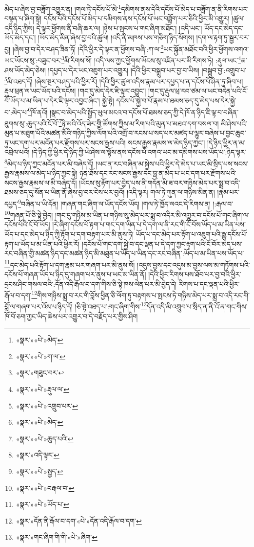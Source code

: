 མེད་པ་ཞེས་བྱ་བཟློག་འགྱུར་ན། །གལ་ཏེ་དངོས་པོ་མེ་\footnote{«སྣར་»«པེ་»མེད་}དམིགས་ནས་དེའི་དངོས་པོ་མེད་པ་བཟློག་ན་ནི་རིགས་པར་བསྟན་པ་ཞིག་སྟེ། དངོས་པོའི་དངོས་པོ་མེད་པ་དམིགས་ནས་དངོས་པོ་ཡང་བཟློག་པར་ཅིའི་ཕྱིར་མི་འགྱུར། །ཚུལ་འདི་ཉིད་ཀྱིས། དེ་ལྟར་ཕྱོགས་ནི་བཞི་ཆར་ལ། །ཉེས་པ་སྤངས་པ་གང་ཞིག་མཐོང་། །འདི་ཡང་། ཡོད་དང་མེད་དང་ཡོད་མེད་དང་། །ཡོད་མེད་མིན་ཞེས་བྱ་བའི་ཚུལ། །འདི་ནི་མཁས་པས་གཅིག་ཉིད་སོགས། །དག་ལ་རྟག་ཏུ་སྦྱར་བར་བྱ། །ཞེས་བྱ་བ་དེར་བཤད་ཟིན་ཏོ། །དེའི་ཕྱིར་དེ་ལྟར་ན་ཕྱོགས་བཞི་:ཀ་ལ་\footnote{«སྣར་»«པེ་»ག་ལ་}ཡང་སྐྱོན་མཐོང་བའི་ཕྱིར་ཕྱོགས་འགའ་ཡང་ཡོངས་སུ་:བཟུང་བར་\footnote{«སྣར་»གཟུང་བར་}མི་རིགས་སོ། །འདི་ལས་ཀྱང་ཕྱོགས་ཡོངས་སུ་འཛིན་པར་མི་རིགས་ཏེ། :རྡུལ་ཡང་\footnote{«སྣར་»«པེ་»རྡུལ་ལ་}ཆ་ཤས་ཡོད་མེད་ཅེས། །དཔྱད་པ་དེར་ཡང་འཇུག་པར་འགྱུར། །དེའི་ཕྱིར་བསྒྲུབ་པར་བྱ་བ་ཡིས། །བསྒྲུབ་བྱ་:འགྲུབ་པ་\footnote{«སྣར་»«པེ་»འགྲུབ་པར་}མི་འཐད་དོ། །ཞེས་སྔར་བཤད་པའི་ཕྱིར་རོ། །དེའི་ཕྱིར་ཚུལ་འདིས་རྣམ་པར་དཔྱད་པ་ན་དངོས་པོ་ཤིན་ཏུ་ཞིབ་པ། རྡུལ་ཕྲན་ལ་ཡང་ཡོད་པའི་དངོས། །གང་དུ་མེད་དེར་ཇི་ལྟར་འབྱུང་། །གང་དུ་རྡུལ་ཕྲ་རབ་ཙམ་ལ་ཡང་བདེན་པའི་ངོ་བོ་ཡོད་པ་མ་ཡིན་པ་དེར་ཇི་ལྟར་འབྱང་ཞིང་། སྐྱེ་སྟེ། དངོས་པོ་སྐྱེ་བ་པོ་རྣམ་པ་ཐམས་ཅད་དུ་མེད་པས་དེར་སྐྱེ་བ་:མེད་པ་\footnote{«སྣར་»«པེ་»མེད་}ཁོ་ནའོ། །སྣང་བ་མེད་པའི་སྤྱོད་ཡུལ་མངའ་བ་དངོས་པོ་ཐམས་ཅད་ཀྱི་དེ་ཁོ་ན་ཉིད་ཇི་ལྟ་བ་བཞིན་ཐུགས་སུ་:ཆུད་པའི་ངོ་བོ་\footnote{«སྣར་»«པེ་»ཆུད་པའི་}ཉི་མའི་འོད་ཟེར་གྱི་ཚོགས་ཀྱིས་མ་རིག་པའི་མུན་པ་མཐའ་དག་བསལ་བ། མི་ཤེས་པའི་མུན་པ་མཐུག་པོའི་མཚན་མོའི་གཉིད་ཀྱིས་ལོག་པའི་འགྲོ་བ་རངས་པ་སད་པར་མཛད་པ་ལྷུར་བཞེས་པ་བྱང་ཆུབ་ཏུ་ཡང་དག་པར་མངོན་པར་རྫོགས་པར་སངས་རྒྱས་པའི། སངས་རྒྱས་རྣམས་ལ་མེད་ཉིད་ཀྱང་། །དེ་ཉིད་ཕྱིར་ན་མ་འབྲེལ་པའོ། །དེ་ཉིད་ཀྱི་ཕྱིར་དེ་ཉིད་ཀྱི་ཡེ་ཤེས་ལ་ལྟོས་ནས་དངོས་པོ་འགའ་ཡང་མ་དམིགས་པས་ཡོད་པ་:ཉིད་ལྟར་\footnote{«སྣར་»འདི་ལྟར་}མེད་པ་ཉིད་ཀྱང་མངོན་པར་མི་བཞེད་དོ། །ཡང་ན་རང་བཞིན་མ་སྐྱེས་པའི་ཕྱིར་དེ་མེད་པ་ཡང་མི་སྲིད་པས་སངས་རྒྱས་རྣམས་ལ་མེད་པ་ཉིད་ཀྱང་སྟེ། ཉན་ཐོས་དང་རང་སངས་རྒྱས་དང་བླ་ན་མེད་པ་ཡང་དག་པར་རྫོགས་པའི་སངས་རྒྱས་རྣམས་ལ་མི་བཞེད་དོ། །ཡོངས་སུ་རྟོག་པར་བྱེད་པས་ནི་གདོན་མི་ཟ་བར་གཉིས་མེད་པར་སྨྲ་བ་འདི་ཐམས་ཅད་དུ་སོན་པ་ཡིན་ནོ་ཞེས་བྱ་བར་ངེས་པར་བྱའོ། །འདི་ལྟར། གལ་ཏེ་ཀུན་ལ་གཉིས་མིན་ན། །རྣམ་པར་དཔྱད་\footnote{«སྣར་»«པེ་»སྤྱད་}བཞིན་པ་ཡི་དོན། །གཞན་གང་ཞིག་ལ་ཡོད་དངོས་ཡོད། །གལ་ཏེ་ཁྱོད་ལའང་དེ་རིགས་ན། །:རྒལ་བ་\footnote{«སྣར་»«པེ་»བརྒལ་བ་}གཞན་པོ་ཅི་སྟེ་བྱེད། །གང་དུ་གཉིས་མ་ཡིན་པ་གཉིས་སུ་མེད་པར་སྨྲ་བ་འདིར་མི་འགྱུར་བ་དངོས་པོ་གང་ཞིག་ལ་དངོས་པོའི་ངོ་བོ་ཡོད། །རེ་ཞིག་དངོས་པོ་རྟག་པ་གང་དག་ཡིན་པ་དེ་དག་ལ་ནི་རང་གི་ངོ་བོས་ཡོད་པ་མ་ཡིན་པས་ཡོད་པ་དང་མེད་པ་ཉིད་ཀྱི་རྟོག་པ་དག་བརྟག་པར་མི་ནུས་ཏེ། ཡོད་པ་དང་མེད་པར་རྟོག་པ་འཇུག་པའི་རྒྱུ་དངོས་པོ་རྟག་པ་ཡོད་པ་མ་ཡིན་པའི་ཕྱིར་རོ། །དངོས་པོ་གང་དག་སྐྱེ་བ་དང་ལྡན་པ་དེ་དག་ཀྱང་རྟག་པའི་ངོ་བོར་མེད་པས་རང་བཞིན་གྱི་མཚན་ཉིད་དང་མཚན་ཉིད་མི་མཐུན་པ་ཡོད་པ་ཡིན་དང་རང་བཞིན་:ཡོད་པ་མ་ཡིན་པས་ཡོད་པ་\footnote{«སྣར་»«པེ་»ཡོད་པ་}དང་མེད་པའི་རྟོག་པ་དག་རྣམ་པར་གཞག་པར་མི་ནུས་སོ། །འདུས་བྱས་དང་འདུས་མ་བྱས་ལས་མ་གཏོགས་པའི་དངོས་པོ་གཞན་ཡོད་པ་ཉིད་དུ་གཞག་པར་ནུས་པ་ཡང་མ་ཡིན་ནོ། །དེའི་ཕྱིར་རིགས་པས་ཐོབ་པར་བྱ་བའི་ཕྱིར་དྲངས་ཤིང་གསལ་བའི་:དོན་འདི་རྒོལ་བ་དག་གིས་ཅི་སྟེ་ཁས་ལེན་པར་མི་བྱེད་དེ། རིགས་པ་དང་ལྡན་པའི་ཕྱིར་རྒོལ་བ་དག་\footnote{«སྣར་»དོན་ནི་རྒོལ་བ་དག་«པེ་»དོན་འདི་རྒོལ་བ་དག་}གིས་གཉིས་སྨྲ་བ་རང་གི་བློས་ཕྱིན་ཅི་ལོག་ཏུ་བརྟགས་པ་སྤངས་ཏེ་གཉིས་མེད་པར་སྨྲ་བ་འདི་རང་གི་བློ་ལ་གཞག་པར་འོས་པ་ཉིད་དོ། །ཅི་སྟེ་འཐད་པ་:གང་ཞིག་གིས་\footnote{«སྣར་»གང་ཞིག་ིག་གི་«པེ་»ཞིག་}དོན་འདི་མི་འགྲུབ་པ་སྲིད་ན་ནི་འོ་ན་གང་གིས་ཁོ་བོ་ཅག་ཀྱང་ཡིད་ཆེས་པར་འགྱུར་བ་དེ་བརྗོད་པར་གྱིས་ཤིག 
